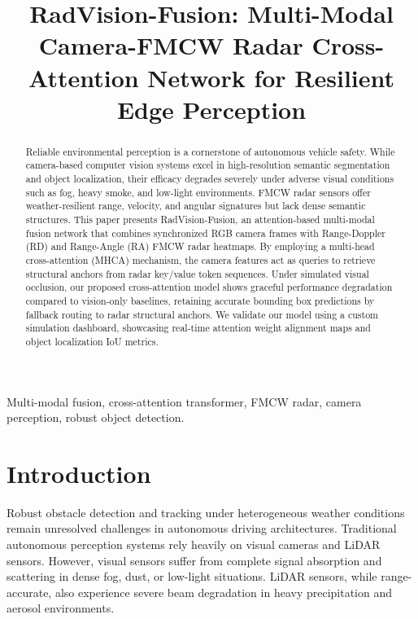 \documentclass[conference]{IEEEtran}
\begin{document}
\title{RadVision-Fusion: Multi-Modal Camera-FMCW Radar Cross-Attention Network for Resilient Edge Perception\\
}

\author{
}

\maketitle

\begin{abstract}
Reliable environmental perception is a cornerstone of autonomous vehicle safety. While camera-based computer vision systems excel in high-resolution semantic segmentation and object localization, their efficacy degrades severely under adverse visual conditions such as fog, heavy smoke, and low-light environments. FMCW radar sensors offer weather-resilient range, velocity, and angular signatures but lack dense semantic structures. This paper presents RadVision-Fusion, an attention-based multi-modal fusion network that combines synchronized RGB camera frames with Range-Doppler (RD) and Range-Angle (RA) FMCW radar heatmaps. By employing a multi-head cross-attention (MHCA) mechanism, the camera features act as queries to retrieve structural anchors from radar key/value token sequences. Under simulated visual occlusion, our proposed cross-attention model shows graceful performance degradation compared to vision-only baselines, retaining accurate bounding box predictions by fallback routing to radar structural anchors. We validate our model using a custom simulation dashboard, showcasing real-time attention weight alignment maps and object localization IoU metrics.
\end{abstract}

\begin{IEEEkeywords}
Multi-modal fusion, cross-attention transformer, FMCW radar, camera perception, robust object detection.
\end{IEEEkeywords}

\section{Introduction}
Robust obstacle detection and tracking under heterogeneous weather conditions remain unresolved challenges in autonomous driving architectures. Traditional autonomous perception systems rely heavily on visual cameras and LiDAR sensors. However, visual sensors suffer from complete signal absorption and scattering in dense fog, dust, or low-light situations. LiDAR sensors, while range-accurate, also experience severe beam degradation in heavy precipitation and aerosol environments. 
\end{document}
